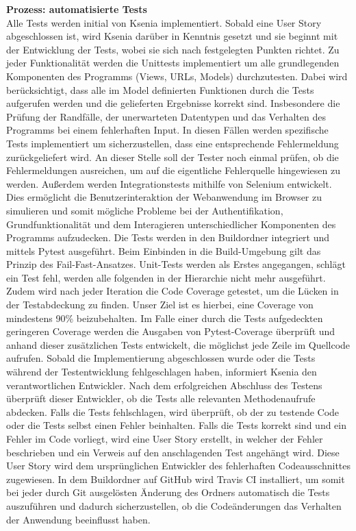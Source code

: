 \documentclass[accentcolor=tud0b,12pt,paper=a4]{tudreport}
\begin{document}
\noindent \textbf{Prozess: automatisierte Tests}\\
 Alle Tests werden initial von Ksenia implementiert. Sobald eine User Story abgeschlossen ist, wird Ksenia darüber in Kenntnis gesetzt und sie beginnt mit der Entwicklung der Tests, wobei sie sich nach festgelegten Punkten richtet.
Zu jeder Funktionalität werden die Unittests implementiert um alle grundlegenden Komponenten des Programms (Views, URLs, Models) durchzutesten. Dabei wird berücksichtigt, dass alle im Model definierten Funktionen durch die Tests aufgerufen werden und die gelieferten Ergebnisse korrekt sind.  Insbesondere die Prüfung der Randfälle, der unerwarteten Datentypen und das Verhalten des Programms bei einem fehlerhaften Input. In diesen Fällen werden spezifische Tests implementiert um sicherzustellen, dass eine entsprechende Fehlermeldung zurückgeliefert wird.
An dieser Stelle soll der Tester noch einmal prüfen, ob die Fehlermeldungen ausreichen, um auf die eigentliche Fehlerquelle hingewiesen zu werden.
Außerdem werden  Integrationstests mithilfe von Selenium entwickelt. Dies ermöglicht die Benutzerinteraktion der Webanwendung  im Browser zu simulieren und somit mögliche Probleme bei der Authentifikation, Grundfunktionalität und dem Interagieren unterschiedlicher Komponenten des Programms aufzudecken.
Die Tests werden in den Buildordner integriert und mittels Pytest ausgeführt. 
Beim Einbinden in die Build-Umgebung gilt das Prinzip des Fail-Fast-Ansatzes. Unit-Tests werden als Erstes angegangen, schlägt ein Test fehl, werden alle folgenden in der Hierarchie nicht mehr ausgeführt. Zudem wird nach jeder Iteration die Code Coverage getestet, um die Lücken in der Testabdeckung zu finden. Unser Ziel ist es hierbei, eine Coverage von mindestens 90\% beizubehalten. Im Falle einer durch die Tests aufgedeckten  geringeren Coverage werden die Ausgaben von Pytest-Coverage überprüft und anhand dieser zusätzlichen Tests entwickelt, die möglichst jede Zeile im Quellcode aufrufen. 
Sobald die Implementierung abgeschlossen wurde oder die Tests während der Testentwicklung fehlgeschlagen haben, informiert Ksenia den verantwortlichen Entwickler. Nach dem erfolgreichen Abschluss des Testens überprüft dieser Entwickler, ob die Tests alle relevanten Methodenaufrufe abdecken. Falls die Tests fehlschlagen, wird überprüft,  ob der zu testende Code oder die Tests selbst einen Fehler beinhalten. 
Falls die Tests korrekt sind und ein Fehler im Code vorliegt, wird eine User Story erstellt, in welcher der Fehler beschrieben und ein Verweis auf den anschlagenden Test angehängt wird. Diese User Story wird dem ursprünglichen Entwickler des fehlerhaften Codeausschnittes zugewiesen.
In dem Buildordner auf GitHub  wird Travis CI installiert, um somit bei jeder durch Git ausgelösten Änderung des Ordners automatisch die Tests auszuführen und dadurch sicherzustellen, ob die Codeänderungen das Verhalten der Anwendung beeinflusst haben.
\end{document}
